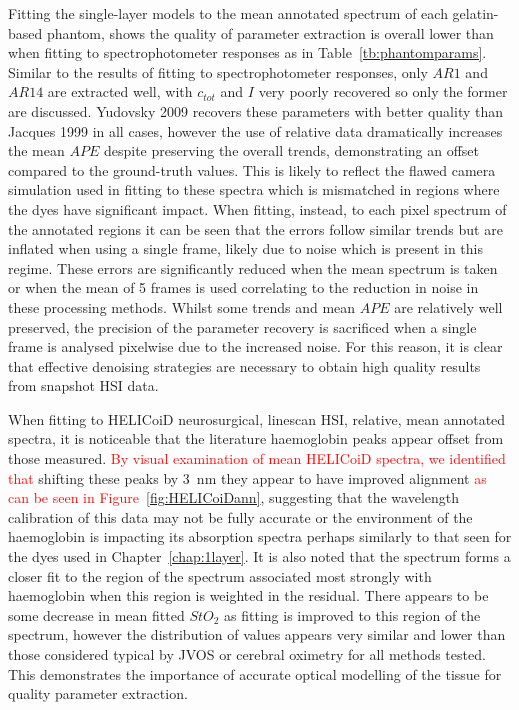 Fitting the single-layer models to the mean annotated spectrum of each gelatin-based phantom, shows the quality of parameter extraction is overall lower than when fitting to spectrophotometer responses as in Table~\ref{tb:phantomparams}. Similar to the results of fitting to spectrophotometer responses, only $AR1$ and $AR14$ are extracted well, with $c_{tot}$ and $I$ very poorly recovered so only the former are discussed. Yudovsky 2009 recovers these parameters with better quality than Jacques 1999 in all cases, however the use of relative data dramatically increases the mean $APE$ despite preserving the overall trends, demonstrating an offset compared to the ground-truth values. This is likely to reflect the flawed camera simulation used in fitting to these spectra which is mismatched in regions where the dyes have significant impact. When fitting, instead, to each pixel spectrum of the annotated regions it can be seen that the errors follow similar trends but are inflated when using a single frame, likely due to noise which is present in this regime. These errors are significantly reduced when the mean spectrum is taken or when the mean of 5 frames is used correlating to the reduction in noise in these processing methods. Whilst some trends and mean $APE$ are relatively well preserved, the precision of the parameter recovery is sacrificed when a single frame is analysed pixelwise due to the increased noise. For this reason, it is clear that effective denoising strategies are necessary to obtain high quality results from snapshot HSI data. 

When fitting to HELICoiD neurosurgical, linescan HSI, relative, mean annotated spectra, it is noticeable that the literature haemoglobin peaks appear offset from those measured. \textcolor{red}{By visual examination of mean HELICoiD spectra, we identified that} shifting these peaks by 3~nm they appear to have improved alignment \textcolor{red}{as can be seen in Figure~\ref{fig:HELICoiDann}}, suggesting that the wavelength calibration of this data may not be fully accurate or the environment of the haemoglobin is impacting its absorption spectra perhaps similarly to that seen for the dyes used in Chapter~\ref{chap:1layer}. It is also noted that the spectrum forms a closer fit to the region of the spectrum associated most strongly with haemoglobin when this region is weighted in the residual. There appears to be some decrease in mean fitted $StO_2$ as fitting is improved to this region of the spectrum, however the distribution of values appears very similar and lower than those considered typical by JVOS or cerebral oximetry for all methods tested. This demonstrates the importance of accurate optical modelling of the tissue for quality parameter extraction. 

